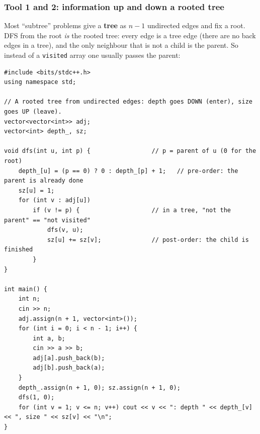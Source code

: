\subsubsection*{Tool 1 and 2: information up and down a rooted tree}

Most ``subtree'' problems give a \textbf{tree} as $n-1$ undirected edges and fix a root. DFS from the root \emph{is} the rooted tree: every edge is a tree edge (there are no back edges in a tree), and the only neighbour that is not a child is the parent. So instead of a \texttt{visited} array one usually passes the parent:

\begin{lstlisting}[style=cpp]
#include <bits/stdc++.h>
using namespace std;

// A rooted tree from undirected edges: depth goes DOWN (enter), size goes UP (leave).
vector<vector<int>> adj;
vector<int> depth_, sz;

void dfs(int u, int p) {                 // p = parent of u (0 for the root)
    depth_[u] = (p == 0) ? 0 : depth_[p] + 1;   // pre-order: the parent is already done
    sz[u] = 1;
    for (int v : adj[u])
        if (v != p) {                    // in a tree, "not the parent" == "not visited"
            dfs(v, u);
            sz[u] += sz[v];              // post-order: the child is finished
        }
}

int main() {
    int n;
    cin >> n;
    adj.assign(n + 1, vector<int>());
    for (int i = 0; i < n - 1; i++) {
        int a, b;
        cin >> a >> b;
        adj[a].push_back(b);
        adj[b].push_back(a);
    }
    depth_.assign(n + 1, 0); sz.assign(n + 1, 0);
    dfs(1, 0);
    for (int v = 1; v <= n; v++) cout << v << ": depth " << depth_[v] << ", size " << sz[v] << "\n";
}
\end{lstlisting}

\begin{diagrambox}
\end{diagrambox}

